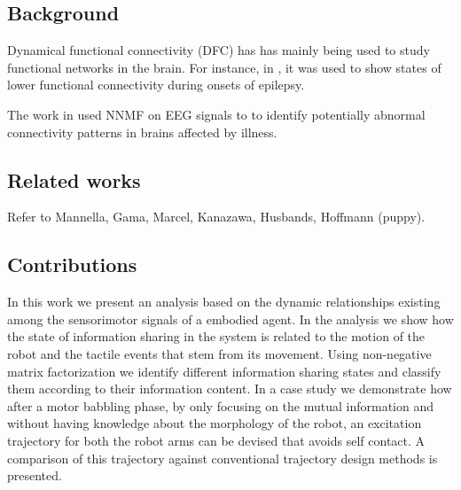 \subsection{Background}
Dynamical functional connectivity (DFC) has has mainly being used to study functional networks in the brain. For instance, in \cite{Christiaen2020Dynamicfunctionalconnectivity}, it was used to show states of lower functional connectivity during onsets of epilepsy.

The work in \cite{Zhou2020Earlychildhooddevelopmental} used NNMF on EEG signals to to identify potentially abnormal connectivity patterns in brains affected by illness.

\subsection{Related works}

Refer to Mannella, Gama, Marcel, Kanazawa, Husbands, Hoffmann (puppy).

\subsection{Contributions}
In this work we present an analysis based on the dynamic relationships existing among the sensorimotor signals of a embodied agent. In the analysis we show how the state of information sharing in the system is related to the motion of the robot and the tactile events that stem from its movement. Using non-negative matrix factorization we identify different information sharing states and classify them according to their information content. In a case study we demonstrate how after a motor babbling phase, by only focusing on the mutual information and without having knowledge about the morphology of the robot, an excitation trajectory for both the robot arms can be devised that avoids self contact. A comparison of this trajectory against conventional trajectory design methods is presented.

